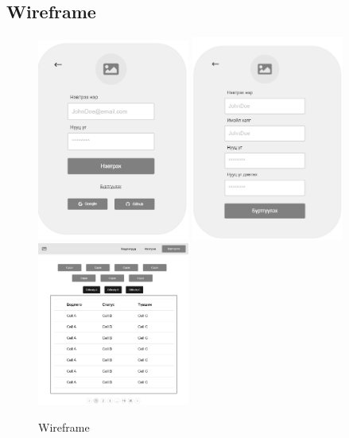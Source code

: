 \subsection{Wireframe}
\begin{figure}[h]
  \centering
  \includegraphics[width=5cm]{img/wireframe/login.PNG}
  \includegraphics[width=5cm]{img/wireframe/register.PNG}
  \includegraphics[width=5cm]{img/wireframe/problems.PNG}
  \caption{Wireframe}
\end{figure}

